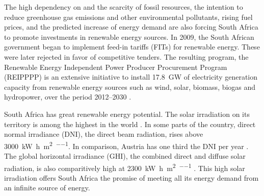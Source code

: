The high dependency on and the scarcity of fossil resources, the intention to reduce greenhouse gas emissions and other environmental pollutants, rising fuel prices, and the predicted increase of energy demand are also forcing South Africa to promote investments in renewable energy sources. In 2009, the South African government began to implement feed-in tariffs (FITs) for renewable energy. These were later rejected in favor of competitive tenders. The resulting program, the Renewable Energy Independent Power Producer Procurement Program (REIPPPP) is an extensive initiative to install \SI{17.8}{\giga\watt} of electricity generation capacity from renewable energy sources such as wind, solar, biomass, biogas and hydropower, over the period 2012–2030 \cite{DEA2015,DoE2013,Eberhard2014}.


South Africa has great renewable energy potential. The solar irradiation on its territory is among the highest in the world \cite{IRENA2014}. In some parts of the country, direct normal irradiance (DNI), the direct beam radiation, rises above \SI{3000}{\kilo\watt\hour\per\square\metre\per\year}. In comparison, Austria has one third the DNI per year \cite{SolarGIS2013a,SolarGIS2013}. The global horizontal irradiance (GHI), the combined direct and diffuse solar radiation, is also comparitively high at \SI{2300}{\kilo\watt\hour\per\square\metre\per\year} \cite{SolarGIS2011}. This high solar irradiation offers South Africa the promise of meeting all its energy demand from an infinite source of energy.

